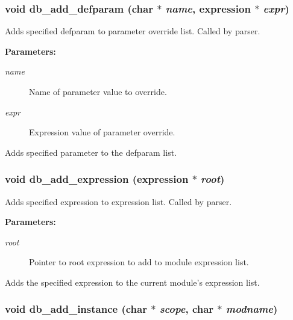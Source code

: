 \subsubsection{\setlength{\rightskip}{0pt plus 5cm}void db\_\-add\_\-defparam (char $\ast$ {\em name}, {\bf expression} $\ast$ {\em expr})}\label{db_8h_a7}


Adds specified defparam to parameter override list. Called by parser.

\begin{Desc}
\item[{\bf Parameters: }]\par
\begin{description}
\item[
{\em name}]Name of parameter value to override. \item[
{\em expr}]Expression value of parameter override.

\end{description}
\end{Desc}
Adds specified parameter to the defparam list. 
\subsubsection{\setlength{\rightskip}{0pt plus 5cm}void db\_\-add\_\-expression ({\bf expression} $\ast$ {\em root})}\label{db_8h_a12}


Adds specified expression to expression list. Called by parser.

\begin{Desc}
\item[{\bf Parameters: }]\par
\begin{description}
\item[
{\em root}]Pointer to root expression to add to module expression list.

\end{description}
\end{Desc}
Adds the specified expression to the current module's expression list. 
\subsubsection{\setlength{\rightskip}{0pt plus 5cm}void db\_\-add\_\-instance (char $\ast$ {\em scope}, char $\ast$ {\em modname})}\label{db_8h_a2}


